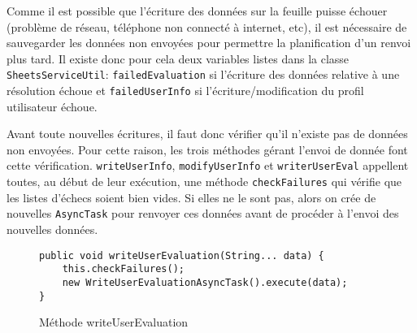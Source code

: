\documentclass[../main.tex]{subfiles}
\begin{document}
Comme il est possible que l’écriture des données sur la feuille puisse échouer (problème de réseau, téléphone non connecté à internet, etc), il est nécessaire de sauvegarder les données non envoyées pour permettre la planification d'un renvoi plus tard. Il existe donc pour cela deux variables listes dans la classe \texttt{SheetsServiceUtil}: \texttt{failedEvaluation} si l'écriture des données relative à une résolution échoue et \texttt{failedUserInfo} si l'écriture/modification du profil utilisateur échoue. 

Avant toute nouvelles écritures, il faut donc vérifier qu'il n'existe pas de données non envoyées. Pour cette raison, les trois méthodes gérant l'envoi de donnée font cette vérification. \texttt{writeUserInfo}, \texttt{modifyUserInfo} et \texttt{writerUserEval} appellent toutes, au début de leur exécution, une méthode \texttt{checkFailures} qui vérifie que les listes d'échecs soient bien vides. Si elles ne le sont pas, alors on crée de nouvelles \texttt{AsyncTask} pour renvoyer ces données avant de procéder à l'envoi des nouvelles données.

\begin{figure}[ht!]
\begin{lstlisting}[tabsize=3]
public void writeUserEvaluation(String... data) {
	this.checkFailures();
	new WriteUserEvaluationAsyncTask().execute(data);
}
\end{lstlisting}
\caption{Méthode writeUserEvaluation}
\label{fig-writeeval}
\end{figure}	
\end{document}
